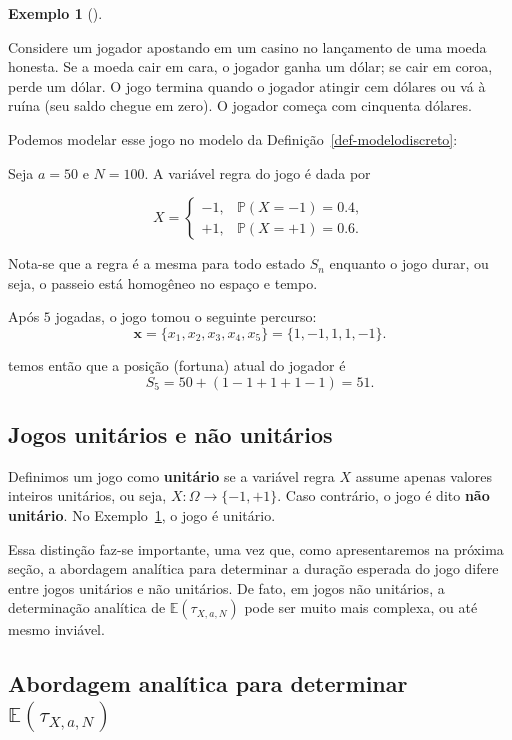 \documentclass[
  brazilian,
  12pt,
]{article}
\theoremstyle{definition}
\theoremstyle{definition}
\newtheorem{example}{Exemplo}[section]
\theoremstyle{remark}
\begin{document}
\begin{example}[]\protect\hypertarget{exm-modelodiscreto}{}\label{exm-modelodiscreto}

Considere um jogador apostando em um casino no lançamento de uma moeda
honesta. Se a moeda cair em cara, o jogador ganha um dólar; se cair em
coroa, perde um dólar. O jogo termina quando o jogador atingir cem
dólares ou vá à ruína (seu saldo chegue em zero). O jogador começa com
cinquenta dólares.

Podemos modelar esse jogo no modelo da
Definição~\ref{def-modelodiscreto}:

Seja \(a = 50\) e \(N = 100\). A variável regra do jogo é dada por

\[
X = \begin{cases}
-1, & \mathbb{P}(X = -1) = 0.4, \\
+1, & \mathbb{P}(X = +1) = 0.6.
\end{cases}
\]

Nota-se que a regra é a mesma para todo estado \(S_n\) enquanto o jogo
durar, ou seja, o passeio está homogêneo no espaço e tempo.

Após \(5\) jogadas, o jogo tomou o seguinte percurso: \[
\pmb{x} = \{x_1, x_2, x_3, x_4, x_5\} = \{1, -1, 1, 1, -1\}.
\]

temos então que a posição (fortuna) atual do jogador é \[
S_5 = 50 + (1 - 1 + 1 + 1 -1) = 51.
\]

\end{example}

\subsection{Jogos unitários e não
unitários}\label{jogos-unituxe1rios-e-nuxe3o-unituxe1rios}

Definimos um jogo como \textbf{unitário} se a variável regra \(X\)
assume apenas valores inteiros unitários, ou seja,
\(X: \Omega \rightarrow \{-1, +1\}\). Caso contrário, o jogo é dito
\textbf{não unitário}. No Exemplo~\ref{exm-modelodiscreto}, o jogo é
unitário.

Essa distinção faz-se importante, uma vez que, como apresentaremos na
próxima seção, a abordagem analítica para determinar a duração esperada
do jogo difere entre jogos unitários e não unitários. De fato, em jogos
não unitários, a determinação analítica de
\(\mathbb{E}(\tau_{X, a, N})\) pode ser muito mais complexa, ou até
mesmo inviável.

\subsection{\texorpdfstring{Abordagem analítica para determinar
\(\mathbb{E}(\tau_{X, a, N})\)}{Abordagem analítica para determinar \textbackslash mathbb\{E\}(\textbackslash tau\_\{X, a, N\})}}\label{sec-anali}
\end{document}
